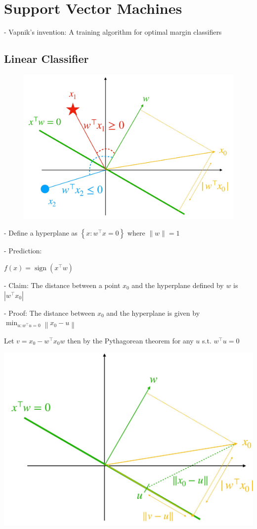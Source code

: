 \section*{Support Vector Machines}

- Vapnik's invention: A training algorithm for optimal margin classifiers


\subsection*{Linear Classifier}

\begin{figure} 
  \centering
  \includegraphics[width=0.6\columnwidth]{figures/hyperplane1.jpg}
\end{figure}

- Define a hyperplane as $\left\{x: w^{\top} x=0\right\}$ where $\|w\|=1$

- Prediction:

$
f(x)=\operatorname{sign}\left(x^{\top} w\right)
$

- Claim: The distance between a point $x_{0}$ and the hyperplane defined by $w$ is $\left|w^{\top} x_{0}\right|$

- Proof: The distance between $x_{0}$ and the hyperplane is given by $\min _{u: w^{\top} u=0}\left\|x_{0}-u\right\|$

Let $v=x_{0}-w^{\top} x_{0} w$ then by the Pythagorean theorem for any $u$ s.t. $w^{\top} u=0$

  \includegraphics[width=0.9\columnwidth]{figures/hyperplane2.jpg}

